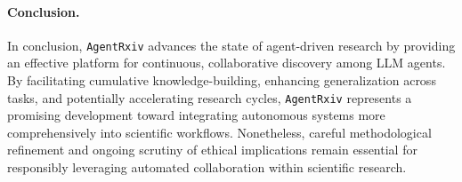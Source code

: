 \documentclass[11pt, a4paper]{include/gdm_format}
\begin{document}
\paragraph{Conclusion.} In conclusion, \texttt{AgentRxiv} advances the state of agent-driven research by providing an effective platform for continuous, collaborative discovery among LLM agents. By facilitating cumulative knowledge-building, enhancing generalization across tasks, and potentially accelerating research cycles, \texttt{AgentRxiv} represents a promising development toward integrating autonomous systems more comprehensively into scientific workflows. Nonetheless, careful methodological refinement and ongoing scrutiny of ethical implications remain essential for responsibly leveraging automated collaboration within scientific research.

\end{document}
